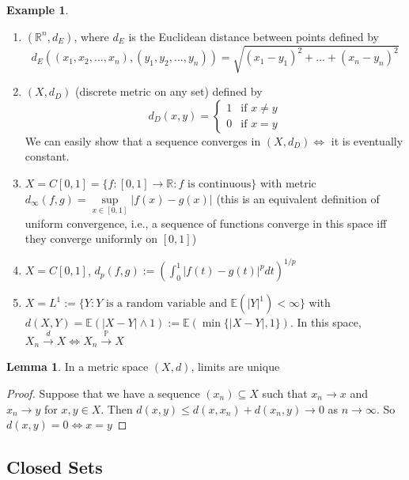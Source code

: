 \documentclass[11pt,a4paper]{article}
\theoremstyle{definition}
\newtheorem{lemma}{Lemma}[section]
\newtheorem{example}{Example}[section]
\begin{document}
\begin{example} $ $
\begin{enumerate}
\item $(\mathbb{R}^n, d_E)$, where $d_E$ is the Euclidean distance between points defined by \[
    d_E((x_1,x_2,...,x_n), (y_1,y_2,...,y_n)) = \sqrt{(x_1-y_1)^2 + ... + (x_n - y_n)^2}
    \]
    \item $(X, d_D)$ (discrete metric on any set) defined by \[
    d_D(x,y) = \begin{cases}
        1 & \text{if } x \ne y \\ 
        0 & \text{if } x = y
    \end{cases}
    \] 
    We can easily show that a sequence converges in $(X, d_D) \iff$ it is eventually constant.
    \item $X = C[0,1] = \{f:[0,1] \to \mathbb{R}: f \text{ is continuous}\}$ with metric $d_\infty (f,g) = \sup \limits _{x \in [0,1]}|f(x)-g(x)|$ (this is an equivalent definition of uniform convergence, i.e., a sequence of functions converge in this space iff they converge uniformly on $[0,1]$)
    \item $X = C[0,1]$, $d_p(f,g) := \left ( \int _0^1 |f(t)-g(t)|^pdt\right )^{1/p}$
    \item $X = L^1 := \{Y: Y \text{ is a random variable and } \mathbb{E}(|Y|^1)< \infty\}$ with \\ $d(X,Y) = \mathbb{E} (|X-Y| \land 1) := \mathbb{E} (\min \{|X-Y|, 1\})$. In this space, $X_n \xrightarrow{d}X \iff X_n \xrightarrow{\mathbb{P}}X $
\end{enumerate}
\end{example}

\begin{lemma}
    In a metric space $(X,d)$, limits are unique
\end{lemma}

\begin{proof}
    Suppose that we have a sequence $(x_n) \subseteq X$ such that $x_n  \to x$ and $x_n \to y$ for $x,y \in X$. Then $d(x,y) \le d(x, x_n) + d(x_n, y) \to 0$ as $n \to \infty$. So $d(x,y) = 0 \iff x=y$
\end{proof}

\subsection*{Closed Sets}
\end{document}
